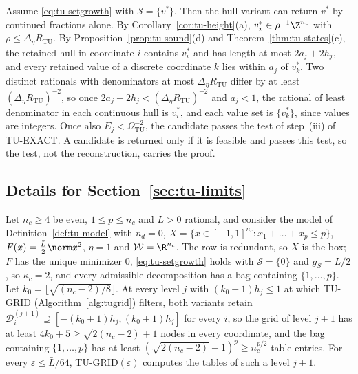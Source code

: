 \begin{remark}\label{rem:tu-cf}
Assume \eqref{eq:tu-setgrowth} with $\mathcal S=\{v^*\}$. Then the hull
variant can return $v^*$ by continued fractions alone. By
Corollary~\ref{cor:tu-height}(a), $v^*_x\in\rho^{-1}\Z^{n_c}$ with
$\rho\le\Delta_\eta R_{\mathrm{TU}}$. By Proposition~\ref{prop:tu-sound}(d)
and Theorem~\ref{thm:tu-states}(c), the retained hull in coordinate $i$
contains $v^*_i$ and has length at most $2a_j+2h_j$, and every retained value
of a discrete coordinate $k$ lies within $a_j$ of $v^*_k$. Two distinct rationals with denominators at most
$\Delta_\eta R_{\mathrm{TU}}$ differ by at least $(\Delta_\eta R_{\mathrm{TU}})^{-2}$,
so once $2a_j+2h_j<(\Delta_\eta R_{\mathrm{TU}})^{-2}$ and $a_j<1$, the rational
of least denominator in each continuous hull is $v^*_i$, and each value set
is $\{v^*_k\}$, since values are integers. Once also
$E_j<\Omega_{\mathrm{TU}}^{-2}$, the candidate passes the test of
step~(iii) of TU-EXACT. A candidate is returned only if it is feasible and
passes this test, so the test, not the reconstruction, carries the proof.
\end{remark}

\subsection{Details for Section~\ref{sec:tu-limits}}\label{app:tu-limits}

\begin{lemma}\label{lem:tu-uniform}
Let $n_c\ge4$ be even, $1\le p\le n_c$ and $\bar L>0$ rational, and consider
the model of Definition~\ref{def:tu-model} with $n_d=0$,
$X=\{x\in[-1,1]^{n_c}:x_1+\dots+x_p\le p\}$, $F(x)=\frac{\bar L}2\norm x^2$,
$\eta=1$ and $\mathcal W=\R^{n_c}$. The row is redundant, so $X$ is the box;
$F$ has the unique minimizer $0$, \eqref{eq:tu-setgrowth} holds with
$\mathcal S=\{0\}$ and $g_S=\bar L/2$, so $\kappa_c=2$, and every admissible
decomposition has a bag containing $\{1,\dots,p\}$. Let
$k_0=\lfloor\sqrt{(n_c-2)/8}\rfloor$. At every level $j$ with
$(k_0+1)h_j\le1$ at which TU-GRID (Algorithm~\ref{alg:tugrid}) filters, both
variants retain $\mathcal D^{(j+1)}_i\supseteq[-(k_0+1)h_j,(k_0+1)h_j]$ for
every $i$, so the grid of level $j+1$ has at least $4k_0+5\ge\sqrt{2(n_c-2)}+1$ nodes in
every coordinate, and the bag containing $\{1,\dots,p\}$ has at least
$(\sqrt{2(n_c-2)}+1)^p\ge n_c^{p/2}$ table entries. For every
$\varepsilon\le\bar L/64$, TU-GRID$(\varepsilon)$ computes the tables of such
a level $j+1$.
\end{lemma}


